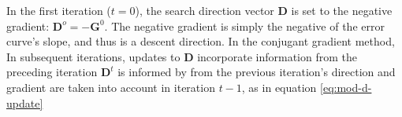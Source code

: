 

In the first iteration ($t = 0$), the search direction vector $\textbf{D}$ is set to the negative gradient:
$\textbf{D}^{o} = - \textbf{G}^{0}$.  The negative gradient is simply the negative of the error curve's slope,
and thus is a descent direction.
In the conjugant gradient method, 
In subsequent iterations, updates to $\textbf{D}$ incorporate information from 
the preceding iteration $\textbf{D}^{t}$
is informed by from the previous iteration's direction and gradient are taken into account in iteration $t-1$, as in equation \eqref{eq:mod-d-update}

 
